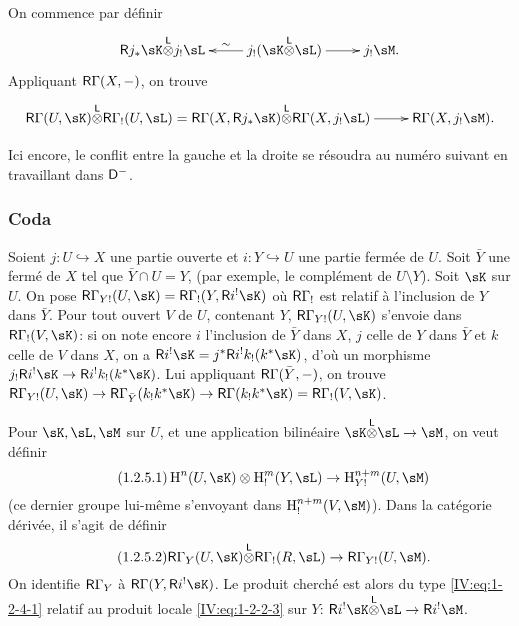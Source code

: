 On commence par définir 
\[\xymatrix{
  \R j_* \sK\lotimes j_! \sL 
    & \ar[l]_-\sim j_!(\sK\lotimes \sL) \ar[r] 
    & j_!\sM \text{.}
}\]
Appliquant $\mathsf{R}\Gamma(X,-)$, on trouve 
\[\xymatrix{
  \R\Gamma(U,\sK)\lotimes\R\Gamma_!(U,\sL) = \R\Gamma(X,\R j_*\sK)\lotimes \R\Gamma(X,j_!\sL) \ar[r] 
    & \R\Gamma(X,j_! \sM) \text{.}
}\]

Ici encore, le conflit entre la gauche et la droite se résoudra au numéro 
suivant en travaillant dans $\mathsf{D}^-$. 





\subsubsection{Coda}\label{IV:1-2-5}

Soient $j:U\hookrightarrow X$ une partie ouverte et $i:Y\hookrightarrow U$ une 
partie fermée de $U$. Soit $\bar Y$ une fermé de $X$ tel que 
$\bar Y\cap U=Y$, (par exemple, le complément de $U\setminus Y$). Soit $\sK$ 
sur $U$. On pose $\R\Gamma_{Y!}(U,\sK)=\R\Gamma_!(Y,\R i^!\sK)$ où 
$\mathsf{R}\Gamma_!$ est relatif à l'inclusion de $Y$ dans $\bar Y$. Pour tout ouvert 
$V$ de $U$, contenant $Y$, $\R\Gamma_{Y!}(U,\sK)$ s'envoie dans 
$\R\Gamma_!(V,\sK)$: si on note encore $i$ l'inclusion de $\bar Y$ dans $X$, 
$j$ celle de $Y$ dans $\bar Y$ et $k$ celle de $V$ dans $X$, on a 
$\R i^!\sK = j^*\R i^! k_!(k^*\sK)$, d'où un morphisme 
$j_!\R i^!\sK \to \R i^! k_!(k^*\sK)$. Lui appliquant 
$\mathsf{R}\Gamma(\bar Y,-)$, on trouve 
$\R\Gamma_{Y!}(U,\sK)\to \R\Gamma_{\bar Y}(k_! k^* \sK) \to \R\Gamma(k_! k^*\sK) = \R\Gamma_!(V,\sK)$. 

Pour $\sK,\sL,\sM$ sur $U$, et une application bilinéaire 
$\sK\lotimes\sL\to\sM$, on veut définir 
\begin{equation*}\tag{1.2.5.1}\label{IV:eq:1-2-5-1}
  \h^n(U,\sK)\otimes \h_!^m(Y,\sL) \to \h_{Y!}^{n+m}(U,\sM)
\end{equation*}
(ce dernier groupe lui-même s'envoyant dans $\h_!^{n+m}(V,\sM)$). Dans la 
catégorie dérivée, il s'agit de définir 
\begin{equation*}\tag{1.2.5.2}\label{IV:eq:1-2-5-2}
  \R\Gamma_Y(U,\sK) \lotimes \R\Gamma_!(R,\sL) \to \R\Gamma_{Y!}(U,\sM) \text{.}
\end{equation*}
On identifie $\mathsf{R}\Gamma_Y$ à $\R\Gamma(Y,\R i^!\sK)$. Le produit cherché 
est alors du type \eqref{IV:eq:1-2-4-1} relatif au produit locale 
\eqref{IV:eq:1-2-2-3} sur $Y$: $\R i^! \sK\lotimes\sL \to \R i^! \sM$. 





